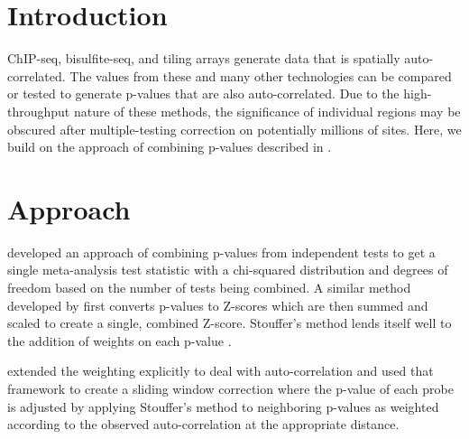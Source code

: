 \documentclass{bioinfo}
\begin{document}
\section{Introduction}
ChIP-seq, bisulfite-seq, and tiling arrays generate data that is spatially
auto-correlated. The values from these and many other technologies can be
compared or tested to generate p-values that are also auto-correlated. Due to the
high-throughput nature of these methods, the significance of individual regions
may be obscured after multiple-testing correction on potentially millions of sites.
Here, we build on the approach of combining p-values described in \citep{Kechris2010}.

\section{Approach}

\citep{Fisher} developed an approach of combining p-values from independent tests
to get a single meta-analysis test statistic with a chi-squared distribution 
and degrees of freedom based on the number of tests being combined.
A similar method developed by \citep{Stouffer} first converts p-values
to Z-scores which are then summed and scaled to create a single, combined Z-score.
Stouffer's method lends itself well to the addition of weights on each p-value
\citep{Liptak}.

\citep{Zaykin} extended the weighting explicitly to deal with auto-correlation and
\citep{Kechris2010} used that framework to create a sliding window correction where
the p-value of each probe is adjusted by applying Stouffer's method to neighboring
p-values as weighted according to the observed auto-correlation at the appropriate
distance.
\end{document}
